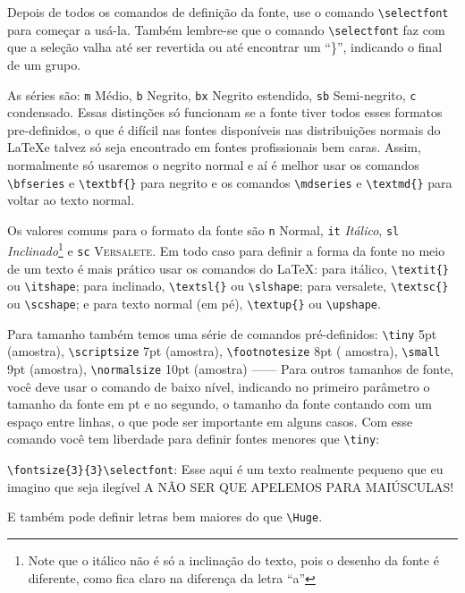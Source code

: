 \documentclass[a4paper,11pt]{scrartcl}
\begin{document}
Depois de todos os comandos de definição da fonte, use o comando
\verb!\selectfont! para começar a usá-la. Também lembre-se que o
comando \verb!\selectfont! faz com que a seleção valha até ser
revertida ou até encontrar um ``\}'', indicando o final de um grupo. 

As séries são: \texttt{m} Médio, \texttt{b} Negrito,
\texttt{bx}
Negrito estendido, \texttt{sb} Semi-negrito, \texttt{c}
condensado.
Essas distinções só funcionam se a fonte tiver todos esses formatos
pre-definidos, o que é difícil nas fontes disponíveis nas
distribuições normais do \LaTeX e talvez só seja encontrado em
fontes profissionais bem caras. Assim, normalmente só usaremos o
negrito normal e aí é melhor usar os comandos \verb!\bfseries! e
\verb!\textbf{}! para negrito e os comandos \verb!\mdseries! e
\verb!\textmd{}! para voltar ao texto normal.

Os valores comuns para o formato da fonte são
\texttt{n} Normal,
\texttt{it} \textit{Itálico}, \texttt{sl}
\textsl{Inclinado}\footnote{Note que o itálico não é só a
inclinação do texto, pois o desenho da fonte é diferente, como fica
claro na diferença da letra ``a''} e \texttt{sc}
\textsc{Versalete}.
Em todo caso para definir a forma da fonte no meio de um texto é
mais prático usar os comandos do \LaTeX: para itálico,
\verb!\textit{}! ou \verb!\itshape!; para inclinado,
\verb!\textsl{}! ou \verb!\slshape!; para versalete,
\verb!\textsc{}! ou \verb!\scshape!; e para texto normal (em pé),
\verb!\textup{}! ou \verb!\upshape!. 

Para tamanho também temos uma série de comandos
pré-definidos:
\verb!\tiny! 5pt ({\tiny amostra}), \verb!\scriptsize! 7pt
({\scriptsize amostra}), \verb!\footnotesize! 8pt ({\footnotesize
amostra}), \verb!\small! 9pt ({\small amostra}), \verb!\normalsize!
10pt ({\normalsize amostra}) ------
Para outros tamanhos de fonte,
você deve usar o comando de baixo nível, indicando no primeiro
parâmetro o tamanho da fonte em pt e no segundo, o tamanho da fonte
contando com um espaço entre linhas, o que pode ser importante em
alguns casos. Com esse comando você tem liberdade para definir
fontes menores que \verb!\tiny!:

\verb!\fontsize{3}{3}\selectfont!:
{\fontsize{3}{3}\selectfont Esse aqui é um texto realmente pequeno
que eu imagino que seja ilegível A NÃO SER QUE APELEMOS PARA
MAIÚSCULAS!}

E também pode definir letras bem maiores do que \verb!\Huge!.
\end{document}
